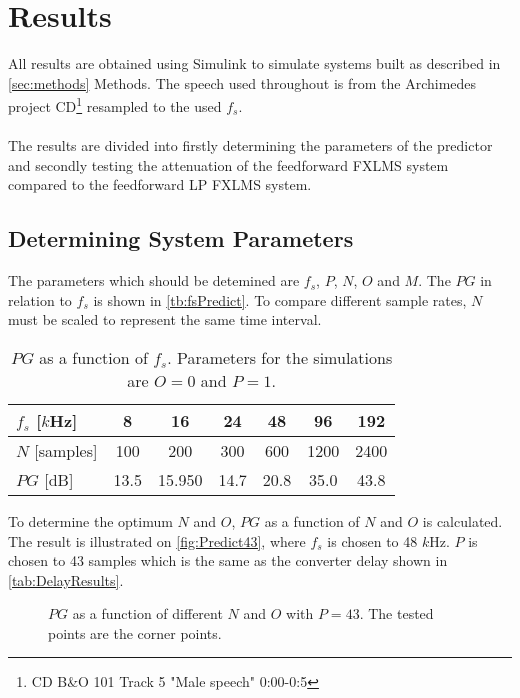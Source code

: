 \section{Results}
All results are obtained using Simulink\textsuperscript{\textregistered} to simulate systems built as described in \autoref{sec:methods} Methods. The speech used throughout is from the Archimedes project CD\footnote{CD B\&O 101 Track 5 "Male speech" 0:00-0:5} resampled to the used $f_s$.  
\\\\
The results are divided into firstly determining the parameters of the predictor and secondly testing the attenuation of the feedforward FXLMS system compared to the feedforward LP FXLMS system.   

\subsection{Determining System Parameters}
The parameters which should be detemined are $f_s$, $P$, $N$, $O$ and $M$.         
The $PG$ in relation to $f_s$ is shown in \autoref{tb:fsPredict}.
To compare different sample rates, $N$ must be scaled to represent the same time interval.  
\begin{table}[H]
\centering
\begin{tabular}{|l|c|c|c|c|c|c|}
\hline
$f_s$ {[}$k$Hz{]} & 8 & 16 & 24 & 48 & 96 & 192 \\ \hline 
$N$ {[}samples{]} & 100 & 200 & 300 & 600 & 1200 & 2400 \\ \hline 
$PG$ {[}dB{]} & 13.5 & 15.950 & 14.7 & 20.8 & 35.0 & 43.8 \\ \hline
\end{tabular}
\caption{$PG$ as a function of $f_s$. Parameters for the simulations are $O=0$ and $P=1$.}
\label{tb:fsPredict}
\end{table}

To determine the optimum  $N$ and $O$, $PG$ as a function of $N$ and $O$ is calculated. The result is illustrated on \autoref{fig:Predict43}, where $f_s$ is chosen to 48 $k$Hz. $P$ is chosen to 43 samples which is the same as the converter delay shown in \autoref{tab:DelayResults}. 

\begin{figure}[H]
	\centering
	
	\caption{$PG$ as a function of different $N$ and $O$ with $P=43$. The tested points are the corner points.}
	\label{fig:Predict43}
\end{figure}

